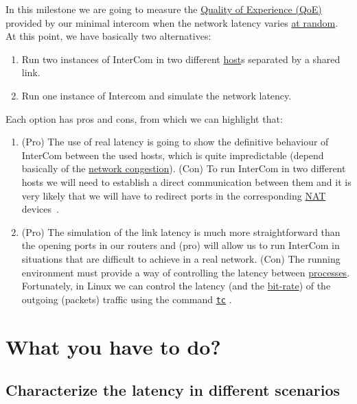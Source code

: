 In this milestone we are going to measure the
\href{https://en.wikipedia.org/wiki/Quality_of_experience}{Quality of
  Experience (QoE)} provided by our minimal intercom when the network
latency varies \href{https://en.wikipedia.org/wiki/Randomness}{at
  random}. At this point, we have basically two alternatives:
\begin{enumerate}
\item Run two instances of InterCom in two different
  \href{https://en.wikipedia.org/wiki/Host_(network)}{host}s separated
  by a shared link.
\item Run one instance of Intercom and simulate the network latency.
\end{enumerate}
Each option has pros and cons, from which we can highlight that:
\begin{enumerate}
\item (Pro) The use of real latency is going to show the definitive
  behaviour of InterCom between the used hosts, which is quite
  impredictable (depend basically of the
  \href{https://en.wikipedia.org/wiki/Network_congestion}{network
    congestion}). (Con) To run InterCom in two different hosts we will
  need to establish a direct communication between them and it is very
  likely that we will have to redirect ports in the corresponding
  \href{https://en.wikipedia.org/wiki/Network_address_translation}{NAT}
  devices~\cite{srisuresh1999nat}.
\item (Pro) The simulation of the link latency is much more
  straightforward than the opening ports in our routers and (pro) will
  allow us to run InterCom in situations that are difficult to achieve
  in a real network. (Con) The running environment must provide a way
  of controlling the latency between
  \href{https://en.wikipedia.org/wiki/Process_(computing)}{processes}. Fortunately,
  in Linux we can control the latency (and the
  \href{https://en.wikipedia.org/wiki/Bit_rate}{bit-rate}) of the
  outgoing (packets) traffic using the command
  \href{https://man7.org/linux/man-pages/man8/tc.8.html}{\texttt{tc}}
  \cite{bert2012lartc}.
\end{enumerate}

\section{What you have to do?}

\subsection{Characterize the latency in different scenarios}

